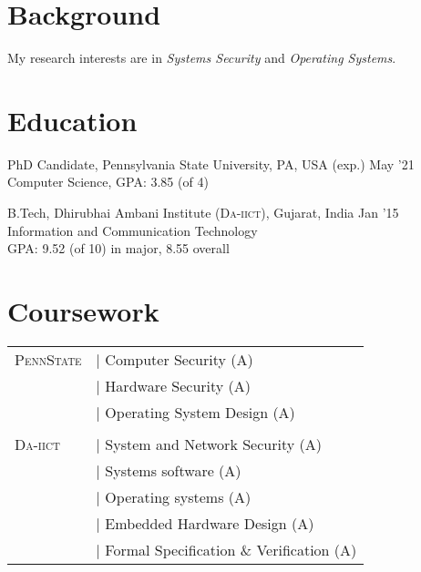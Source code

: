 \documentclass[margin]{res}
\newcommand{\daiict}{\textsc{Da-iict}}
\newcommand{\psu}{\textsc{PennState}}
\begin{document}
\raggedright
{} %

\address{
    blog:// \href{http://adityabasu.me}{adityabasu.me}\\
    github:// \href{https://github.com/mitthu}{mitthu}\\
    linkedIn://  \href{https://www.linkedin.com/in/mitthu}{mitthu}
}

\address{
    W106 Westgate Building\\
    University Park, PA 16802\\
    (814) 862-8300\\
    \href{mailto:aditya.basu@psu.edu}{aditya.basu@psu.edu}
}

\begin{resume} 
\section{Background}
My research interests are in \emph{Systems Security} and \emph{Operating Systems}.

\section{Education}

PhD Candidate, Pennsylvania State University, PA, USA \hfill (exp.) May '21\\
Computer Science, GPA: 3.85 (of 4)

B.Tech, Dhirubhai Ambani Institute (\daiict), Gujarat, India \hfill Jan '15\\
Information and Communication Technology\\
GPA: 9.52 (of 10) in major,
8.55 overall 

\section{Coursework}
\begin{tabular}{l p{2.5in}}
\psu        & $\vert$ Computer Security (A)\\
            & $\vert$ Hardware Security (A)\\
            & $\vert$ Operating System Design (A)\\
\\
\daiict     & $\vert$ System and Network Security (A)\\
            & $\vert$ Systems software (A)\\
            & $\vert$ Operating systems (A)\\
            & $\vert$ Embedded Hardware Design (A)\\
            & $\vert$ Formal Specification \& Verification (A)
\end{tabular}


\end{resume}
\end{document}
